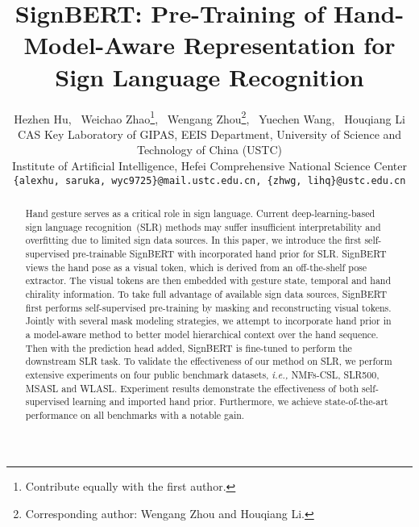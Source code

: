 \documentclass[10pt,twocolumn,letterpaper]{article}
\begin{document}
\title{SignBERT: Pre-Training of Hand-Model-Aware Representation for Sign Language Recognition}

\author{Hezhen Hu{\small }, ~Weichao Zhao{\small }\thanks{Contribute equally with the first author.}, ~Wengang Zhou{\small }\thanks{Corresponding author: Wengang Zhou and Houqiang Li.}, ~Yuechen Wang{\small }, ~Houqiang Li{\small }\\
\normalsize
 CAS Key Laboratory of GIPAS, EEIS Department, University of Science and Technology of China (USTC) \\
\normalsize
 Institute of Artificial Intelligence, Hefei Comprehensive National Science Center\\

\normalsize
{\tt\small \{alexhu, saruka, wyc9725\}@mail.ustc.edu.cn, \{zhwg, lihq\}@ustc.edu.cn}
}



\maketitle
\ificcvfinal\thispagestyle{empty}\fi

\begin{abstract}
Hand gesture serves as a critical role in sign language.
Current deep-learning-based sign language recognition~(SLR) methods may suffer insufficient interpretability and overfitting due to limited sign data sources.
In this paper, we introduce the first self-supervised pre-trainable SignBERT with incorporated hand prior for SLR.
SignBERT views the hand pose as a visual token, which is derived from an off-the-shelf pose extractor.
The visual tokens are then embedded with gesture state, temporal and hand chirality information.
To take full advantage of available sign data sources, SignBERT first performs self-supervised pre-training by masking and reconstructing visual tokens.
Jointly with several mask modeling strategies, we attempt to incorporate hand prior in a model-aware method to better model hierarchical context over the hand sequence.
Then with the prediction head added, SignBERT is fine-tuned to perform the downstream SLR task.
To validate the effectiveness of our method on SLR, we perform extensive experiments on four public benchmark datasets, \emph{i.e.,} NMFs-CSL, SLR500, MSASL and WLASL.
Experiment results demonstrate the effectiveness of both self-supervised learning and imported hand prior.
Furthermore, we achieve state-of-the-art performance on all benchmarks with a notable gain.
\vspace{-0.3cm}
\end{abstract}
\end{document}
